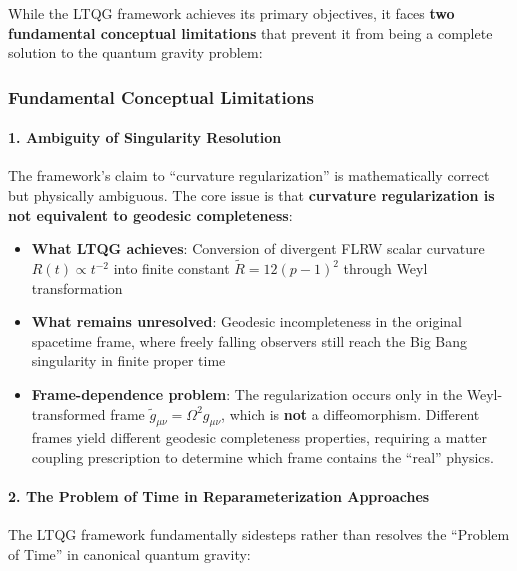 While the LTQG framework achieves its primary objectives, it faces \textbf{two fundamental conceptual limitations} that prevent it from being a complete solution to the quantum gravity problem:

\subsubsection{Fundamental Conceptual Limitations}

\paragraph{1. Ambiguity of Singularity Resolution}
The framework's claim to ``curvature regularization'' is mathematically correct but physically ambiguous. The core issue is that \textbf{curvature regularization is not equivalent to geodesic completeness}:

\begin{itemize}
\item \textbf{What LTQG achieves}: Conversion of divergent FLRW scalar curvature $R(t) \propto t^{-2}$ into finite constant $\tilde{R} = 12(p-1)^2$ through Weyl transformation
\item \textbf{What remains unresolved}: Geodesic incompleteness in the original spacetime frame, where freely falling observers still reach the Big Bang singularity in finite proper time
\item \textbf{Frame-dependence problem}: The regularization occurs only in the Weyl-transformed frame $\tilde{g}_{\mu\nu} = \Omega^2 g_{\mu\nu}$, which is \textbf{not} a diffeomorphism. Different frames yield different geodesic completeness properties, requiring a matter coupling prescription to determine which frame contains the ``real'' physics.
\end{itemize}

\paragraph{2. The Problem of Time in Reparameterization Approaches}
The LTQG framework fundamentally sidesteps rather than resolves the ``Problem of Time'' in canonical quantum gravity:


